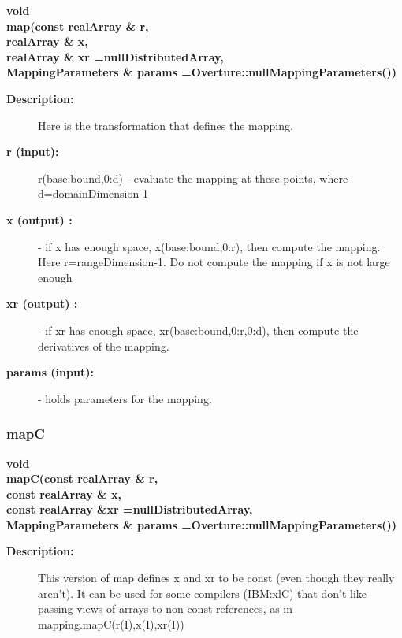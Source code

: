 \begin{flushleft} \textbf{%
void  \\ 
\settowidth{\MappingIncludeArgIndent}{map(}%
map(const realArray \& r, \\ 
\hspace{\MappingIncludeArgIndent}realArray \& x, \\ 
\hspace{\MappingIncludeArgIndent}realArray \& xr  =nullDistributedArray,\\ 
MappingParameters \& params  =Overture::nullMappingParameters())
}\end{flushleft}
\begin{description}
\item[{\bf Description:}] 
 Here is the transformation that defines the mapping.

\item[{\bf r (input):}]  r(base:bound,0:d) - evaluate the mapping at these points, where
       d=domainDimension-1
\item[{\bf x (output) :}]  - if x has enough space, x(base:bound,0:r), then compute
       the mapping. Here r=rangeDimension-1. Do not compute the mapping 
       if x is not large enough
\item[{\bf xr (output) :}]  - if xr has enough space, xr(base:bound,0:r,0:d), then
       compute the derivatives of the mapping.
\item[{\bf params (input):}]  - holds parameters for the mapping.
\end{description}
\subsubsection{mapC}
 
\begin{flushleft} \textbf{%
void  \\ 
\settowidth{\MappingIncludeArgIndent}{mapC(}%
mapC(const realArray \& r, \\ 
\hspace{\MappingIncludeArgIndent}const realArray \& x, \\ 
\hspace{\MappingIncludeArgIndent}const realArray \&xr  =nullDistributedArray, \\ 
MappingParameters \& params  =Overture::nullMappingParameters())
}\end{flushleft}
\begin{description}
\item[{\bf Description:}] 
   This version of map defines x and xr to be const (even though they really aren't).
  It can be used for some compilers (IBM:xlC) that don't like passing
   views of arrays to non-const references, as in mapping.mapC(r(I),x(I),xr(I))
\end{description}
